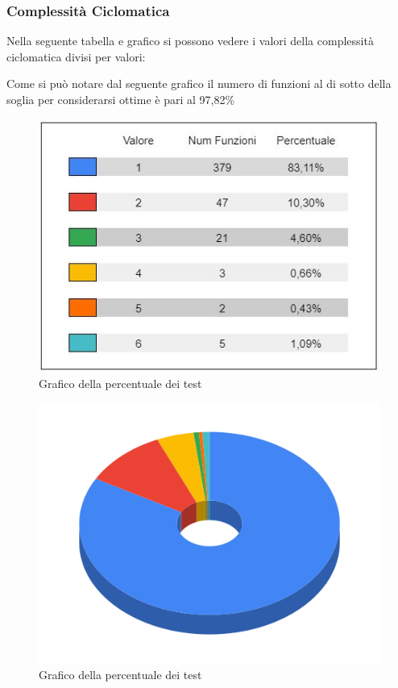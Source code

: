     \newpage
\subsubsection{Complessità Ciclomatica}
    Nella seguente tabella e grafico si possono vedere i valori della complessità ciclomatica divisi per valori:

        Come si può notare dal seguente grafico il numero di funzioni al di sotto della soglia per considerarsi ottime è pari al 97,82\%



    \begin{figure}[H]
        \centering
        \includegraphics[width=10 cm]{source/sections/images/tabella_CC.JPG}
        \caption{Grafico della percentuale dei test}
    \end{figure}

    \begin{figure}[H]
        \centering
        \includegraphics[width=10 cm]{source/sections/images/CC.png}
        \caption{Grafico della percentuale dei test}
    \end{figure}

